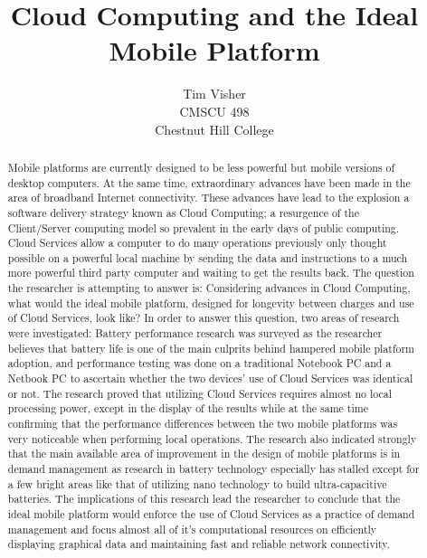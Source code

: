 \documentclass[12pt,oneside,letterpaper,titlepage]{report}
\author{Tim Visher\\ CMSCU 498\\ Chestnut Hill College}
\title{Cloud Computing and the Ideal Mobile Platform}
\begin{document}
\maketitle

\tableofcontents

\newpage

\begin{abstract}

Mobile platforms are currently designed to be less powerful but mobile versions
of desktop computers.  At the same time, extraordinary advances have been made
in the area of broadband Internet connectivity.  These advances have lead to the
explosion a software delivery strategy known as Cloud Computing; a resurgence of
the Client/Server computing model so prevalent in the early days of public
computing.  Cloud Services allow a computer to do many operations previously
only thought possible on a powerful local machine by sending the data and
instructions to a much more powerful third party computer and waiting to get the
results back.  The question the researcher is attempting to answer is:
Considering advances in Cloud Computing, what would the ideal mobile platform,
designed for longevity between charges and use of Cloud Services, look like?  In
order to answer this question, two areas of research were investigated: Battery
performance research was surveyed as the researcher believes that battery life is
one of the main culprits behind hampered mobile platform adoption, and
performance testing was done on a traditional Notebook PC and a Netbook PC to
ascertain whether the two devices' use of Cloud Services was identical or not.
The research proved that utilizing Cloud Services requires almost no local
processing power, except in the display of the results while at the same time
confirming that the performance differences between the two mobile platforms was
very noticeable when performing local operations.  The research also indicated
strongly that the main available area of improvement in the design of mobile
platforms is in demand management as research in battery technology especially
has stalled except for a few bright areas like that of utilizing nano technology
to build ultra-capacitive batteries.  The implications of this research lead the
researcher to conclude that the ideal mobile platform would enforce the use of
Cloud Services as a practice of demand management and focus almost all of it's
computational resources on efficiently displaying graphical data and maintaining
fast and reliable network connectivity.

\end{abstract}
\end{document}
